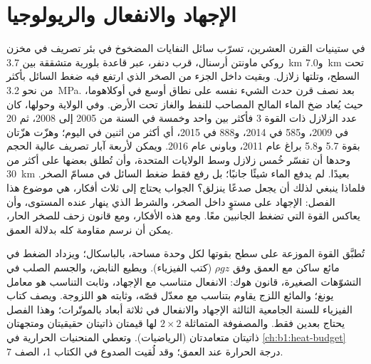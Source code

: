 \chapter{الإجهاد والانفعال والريولوجيا}\label{ch:b1:stress-strain-rheology}

في ستينيات القرن العشرين، تسرّب سائل النفايات المضخوخ في بئر تصريف في مخزن روكي ماونتن أرسنال، قرب دنفر، عبر قاعدة بلورية متشققة بين \qty{3.7}{km} و\qty{7.0}{km} تحت السطح، وتلتها زلازل. وبقيت داخل الجزء من الصخر الذي ارتفع فيه ضغط السائل بأكثر من نحو \qty{3.2}{MPa}.
بعد نصف قرن حدث الشيء نفسه على نطاق أوسع في أوكلاهوما، حيث يُعاد ضخ الماء المالح المصاحب للنفط والغاز تحت الأرض. وفي الولاية وحولها، كان عدد الزلازل ذات القوة 3 فأكثر بين واحد وخمسة في السنة من 2005 إلى 2008، ثم 20 في 2009، و\num{585} في 2014، و\num{888} في 2015، أي أكثر من اثنين في اليوم؛ وهزّت هزّتان بقوة 5.7 و\num{5.8} براغ عام 2011، وباوني عام 2016. ويمكن لأربعة آبار تصريف عالية الحجم وحدها أن تفسّر خُمس زلازل وسط الولايات المتحدة، وأن تُطلق بعضها على أكثر من \qty{30}{km} بعيدًا.
لم يدفع الماء شيئًا جانبًا؛ بل رفع فقط ضغط السائل في مسامّ الصخر. فلماذا ينبغي لذلك أن يجعل صدعًا ينزلق؟ الجواب يحتاج إلى ثلاث أفكار، هي موضوع هذا الفصل: الإجهاد على مستوٍ داخل الصخر، والشرط الذي ينهار عنده المستوى، وأن  يعاكس القوة التي تضغط الجانبين معًا. ومع هذه الأفكار، ومع قانون زحف للصخر الحار، يمكن أن نرسم مقاومة  كله بدلالة العمق.

\begin{recall}
تُطبَّق القوة الموزعة على سطح بقوتها لكل وحدة مساحة، بالباسكال؛ ويزداد الضغط في مائع ساكن مع العمق وفق $\rho g z$ (كتب الفيزياء). ويطيع النابض، والجسم الصلب في التشوّهات الصغيرة، قانون هوك: الانفعال متناسب مع الإجهاد، وثابت التناسب هو معامل يونغ؛ والمائع اللزج يقاوم بتناسب مع معدّل قصّه، وثابته هو اللزوجة. ويصف كتاب الفيزياء للسنة الجامعية الثالثة الإجهاد والانفعال في ثلاثة أبعاد بالموتّرات؛ وهذا الفصل يحتاج بعدين فقط. والمصفوفة المتماثلة $2\times2$ لها قيمتان ذاتيتان حقيقيتان ومتجهتان ذاتيتان متعامدتان (الرياضيات). وتعطي المنحنيات الحرارية في \cref{ch:b1:heat-budget} درجة الحرارة عند العمق؛ وقد لُقيت الصدوع في الكتاب 1، الصف 7.
\end{recall}

